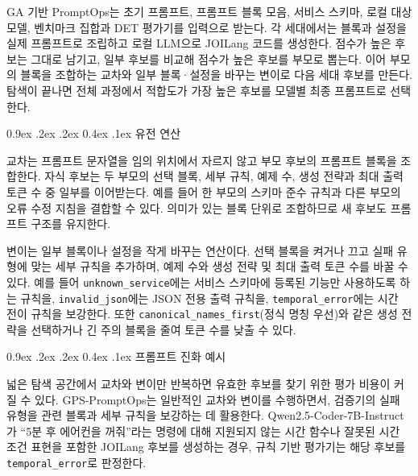 \documentclass[10pt,twocolumn]{article}
\makeatletter
\newenvironment{revision}{\begingroup\color{revisionblue}}{\endgroup}
\renewcommand{\subsection}{\@startsection{subsection}{2}{\z@}%
{0.9ex \@plus .2ex \@minus .2ex}%
{0.4ex \@plus .1ex}%
{\normalfont\normalsize\bfseries}}
\makeatother
\begin{document}
\begin{revision}
GA 기반 PromptOps는 초기 프롬프트, 프롬프트 블록 모음, 서비스 스키마, 로컬 대상 모델, 벤치마크 집합과 DET 평가기를 입력으로 받는다. 각 세대에서는 블록과 설정을 실제 프롬프트로 조립하고 로컬 LLM으로 JOILang 코드를 생성한다. 점수가 높은 후보는 그대로 남기고, 일부 후보를 비교해 점수가 높은 후보를 부모로 뽑는다. 이어 부모의 블록을 조합하는 교차와 일부 블록·설정을 바꾸는 변이로 다음 세대 후보를 만든다. 탐색이 끝나면 전체 과정에서 적합도가 가장 높은 후보를 모델별 최종 프롬프트로 선택한다.
\end{revision}

\subsection{유전 연산}

\begin{revision}
교차는 프롬프트 문자열을 임의 위치에서 자르지 않고 부모 후보의 프롬프트 블록을 조합한다. 자식 후보는 두 부모의 선택 블록, 세부 규칙, 예제 수, 생성 전략과 최대 출력 토큰 수 중 일부를 이어받는다. 예를 들어 한 부모의 스키마 준수 규칙과 다른 부모의 오류 수정 지침을 결합할 수 있다. 의미가 있는 블록 단위로 조합하므로 새 후보도 프롬프트 구조를 유지한다.

변이는 일부 블록이나 설정을 작게 바꾸는 연산이다. 선택 블록을 켜거나 끄고 실패 유형에 맞는 세부 규칙을 추가하며, 예제 수와 생성 전략 및 최대 출력 토큰 수를 바꿀 수 있다. 예를 들어 \texttt{unknown\_service}에는 서비스 스키마에 등록된 기능만 사용하도록 하는 규칙을, \texttt{invalid\_json}에는 JSON 전용 출력 규칙을, \texttt{temporal\_error}에는 시간 전이 규칙을 보강한다. 또한 \texttt{canonical\_names\_first}(정식 명칭 우선)와 같은 생성 전략을 선택하거나 긴 주의 블록을 줄여 토큰 수를 낮출 수 있다.
\end{revision}

\subsection{프롬프트 진화 예시}

넓은 탐색 공간에서 교차와 변이만 반복하면 유효한 후보를 찾기 위한 평가 비용이 커질 수 있다. GPS-PromptOps는 일반적인 교차와 변이를 수행하면서, 검증기의 실패 유형을 관련 블록과 세부 규칙을 보강하는 데 활용한다. Qwen2.5-Coder-7B-Instruct가 ``5분 후 에어컨을 꺼줘''라는 명령에 대해 지원되지 않는 시간 함수나 잘못된 시간 조건 표현을 포함한 JOILang 후보를 생성하는 경우, 규칙 기반 평가기는 해당 후보를 \texttt{temporal\_error}로 판정한다.
\end{document}
